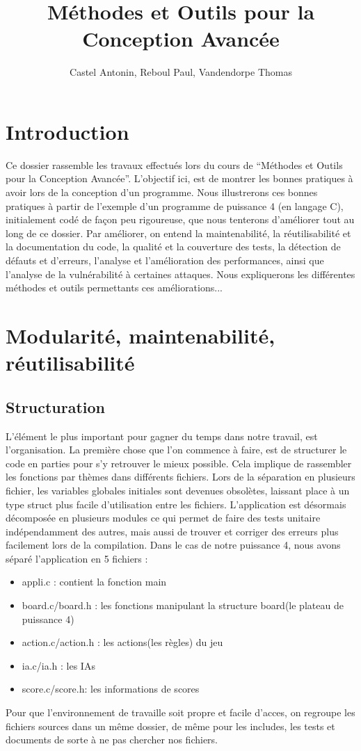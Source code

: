 \documentclass{report}
\title{Méthodes et Outils pour la Conception Avancée}
\author{Castel Antonin, Reboul Paul, Vandendorpe Thomas}
\begin{document}
\maketitle{}
\tableofcontents

\chapter{Introduction}

Ce dossier rassemble les travaux effectués lors du cours de ``Méthodes et Outils pour la Conception Avancée''. L'objectif ici, est de montrer les bonnes pratiques à avoir lors de la conception d'un programme. Nous illustrerons ces bonnes pratiques à partir de l'exemple d'un programme de puissance 4 (en langage C), initialement codé de façon peu rigoureuse, que nous tenterons d'améliorer tout au long de ce dossier. Par améliorer, on entend  la maintenabilité, la réutilisabilité et la documentation du code, la qualité et la couverture des tests, la détection de défauts et d'erreurs, l'analyse et l'amélioration des performances, ainsi que l'analyse de la vulnérabilité à certaines attaques. Nous expliquerons les différentes méthodes et outils permettants ces améliorations...

\chapter{Modularité, maintenabilité, réutilisabilité}
\section{Structuration}
L'élément le plus important pour gagner du temps dans notre travail, est l'organisation. La première chose que l'on commence à faire, est de structurer le code en parties pour s'y retrouver le mieux possible. Cela implique de rassembler les fonctions par thèmes dans différents fichiers. Lors de la séparation en plusieurs fichier, les variables globales initiales sont devenues obsolètes, laissant place à un type struct plus facile d'utilisation entre les fichiers. L'application est désormais décomposée en plusieurs modules ce qui permet de faire des tests unitaire indépendamment des autres, mais aussi de trouver et corriger des erreurs plus facilement lors de la compilation. Dans le cas de notre puissance 4, nous avons séparé l'application en 5 fichiers :
\begin{itemize}
\item appli.c : contient la fonction main
\item board.c/board.h : les fonctions manipulant la structure board(le plateau de puissance 4)
\item action.c/action.h : les actions(les règles) du jeu
\item ia.c/ia.h : les IAs
\item score.c/score.h: les informations de scores
\end{itemize} Pour que l'environnement de travaille soit propre et facile d'acces, on regroupe les fichiers sources dans un même dossier, de même pour les includes, les tests et documents de sorte à ne pas chercher nos fichiers.
\end{document}
